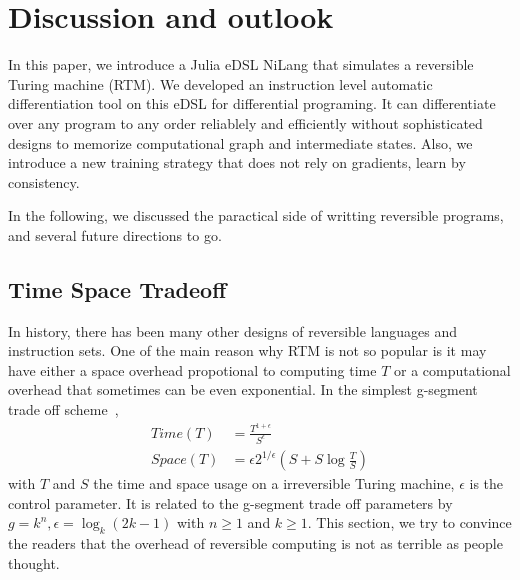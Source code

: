 \documentclass[aps,twocolumn,longbibliography,english,superscriptaddress,prr]{revtex4-1}
\newcommand{\<}{\langle}
\renewcommand{\>}{\rangle}
\newcommand{\Tr}{{\rm Tr}}
\theoremstyle{definition}\newtheorem{definition}{\textit{Definition}}
\begin{document}


\section{Discussion and outlook}\label{sec:discussion}
In this paper, we introduce a Julia eDSL NiLang that simulates a reversible Turing machine (RTM).
We developed an instruction level automatic differentiation tool on this eDSL for differential programing.
It can differentiate over any program to any order reliablely and efficiently without sophisticated designs to memorize computational graph and intermediate states.
Also, we introduce a new training strategy that does not rely on gradients, learn by consistency.

In the following, we discussed the paractical side of writting reversible programs, and several future directions to go.

\subsection{Time Space Tradeoff}\label{sec:timespace}
In history, there has been many other designs of reversible languages and instruction sets.
One of the main reason why RTM is not so popular is it may have either a space overhead propotional to computing time $T$ or a computational overhead that sometimes can be even exponential.
In the simplest g-segment trade off scheme~\cite{Bennett1989,Levine1990},
\begin{align}
    Time(T) &= \frac{T^{1+\epsilon}}{S^\epsilon}\\
    Space(T) &= \epsilon 2^{1/\epsilon}(S+S\log\frac{T}{S})
\end{align}
with $T$ and $S$ the time and space usage on a irreversible Turing machine, $\epsilon$ is the control parameter.
It is related to the g-segment trade off parameters by $g = k^n, \epsilon = \log_k(2k-1)$ with $n\geq 1$ and $k\geq 1$.
This section, we try to convince the readers that the overhead of reversible computing is not as terrible as people thought.
\end{document}
